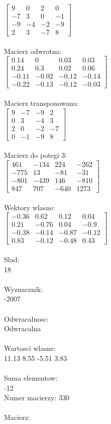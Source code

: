 \documentclass[a4paper,12pt]{article}
\begin{document}
$\begin{bmatrix} 9&0&2&0\\-7&3&0&-1\\-9&-4&-2&-9\\2&3&-7&8 \end{bmatrix}$
\\
\\
Macierz odwrotna:\\

$\begin{bmatrix} 0.14&0&0.03&0.03\\0.24&0.3&0.02&0.06\\-0.11&-0.02&-0.12&-0.14\\-0.22&-0.13&-0.12&-0.03 \end{bmatrix}$
\\
\\
Macierz transponowana:\\

$\begin{bmatrix} 9&-7&-9&2\\0&3&-4&3\\2&0&-2&-7\\0&-1&-9&8 \end{bmatrix}$
\\
\\
Macierz do potegi 3:\\

$\begin{bmatrix} 461&-134&224&-262\\-775&13&-81&-31\\-801&-439&146&-810\\847&707&-640&1273 \end{bmatrix}$
\\
\\
Wektory wlasne:\\

$\begin{bmatrix} -0.36&0.62&0.12&0.04\\0.21&-0.76&0.04&-0.9\\-0.38&-0.14&-0.87&-0.12\\0.83&-0.12&-0.48&0.43 \end{bmatrix}$
\\
\\
Slad:\\
18
\\
\\
Wyznacznik:\\
-2007
\\
\\
Odwracalnosc:\\
Odwracalna
\\
\\
Wartosci wlasne:\\
11.13 8.55 -5.51 3.83
\\
\\
Suma elementow:\\
-12
\\
\newpage
Numer macierzy:
330
\\
\\
Macierz:\\
\end{document}
